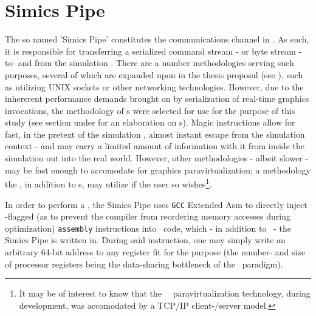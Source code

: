 \section{Simics Pipe}
\label{sec:methodologysolution_simicspipe}
The so named 'Simics Pipe' constitutes the communications channel in \dvttermsimics .
As such, it is responsible for transferring a serialized command stream - or byte stream - to- and from the simulation \dvttermhost .
There are a number methodologies serving such purposes, several of which are expanded upon in the thesis proposal (see ), such as utilizing UNIX sockets or other networking technologies.
However, due to the inhererent performance demands brought on by serialization of real-time graphics invocations, the methodology of \dvttermmagicinstruction s were selected for use for the purpose of this study (see section  under  for an elaboration on \dvttermmagicinstruction s).
Magic instructions allow for fast, in the pretext of the simulation \dvttermtarget , almost instant escape from the simulation context - and may carry a limited amount of information with it from inside the simulation out into the real world.
However, other methodologies - albeit slower - may be fast enough to accomodate for graphics paravirtualization; a methodology the \dvttermandroidemulator , in addition to \dvttermmagicinstruction s, may utilize if the user so wishes\footnote{It may be of interest to know that the \dvttermsimics\ \dvttermopengles\ paravirtualization technology, during development, was accomodated by a TCP/IP client-/server model.}.

In order to perform a \dvttermmagicinstruction , the Simics Pipe uses \texttt{GCC} Extended Asm to directly inject -flagged (as to prevent the compiler from reordering memory accesses during optimization) \texttt{assembly} instructions into \dvttermc\ code, which - in addition to \dvttermcplusplus\ - the Simics Pipe is written in.
During said instruction, one may simply write an arbitrary 64-bit address to any register fit for the purpose (the number- and size of processor registers being the data-sharing bottleneck of the \dvttermmagicinstruction\ paradigm).

